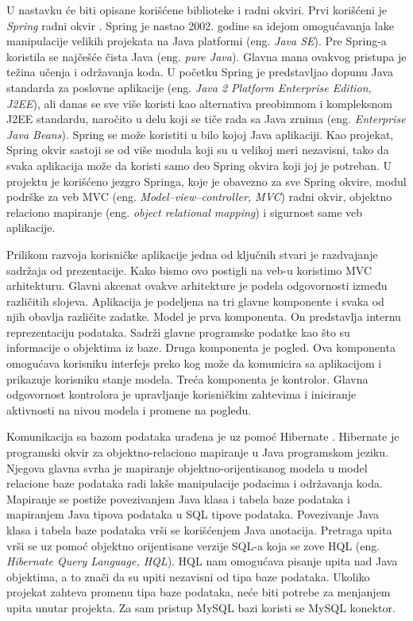 \documentclass[12pt,oneside]{memoir}
\begin{document}
U nastavku će biti opisane korišćene biblioteke i radni okviri. Prvi korišćeni je \textit{Spring} radni okvir \cite{Spring}.
Spring je nastao 2002. godine sa idejom omogućavanja lake manipulacije velikih projekata na Java platformi (eng. \textit{Java SE}). Pre Spring-a koristila se najčešće čista Java (eng. \textit{pure Java}). Glavna mana ovakvog pristupa je težina učenja i održavanja koda. U početku Spring je predstavljao dopunu Java standarda za poslovne aplikacije (eng. \textit{Java 2 Platform Enterprise Edition, J2EE}), ali danas se sve više koristi kao alternativa preobimnom i kompleksnom J2EE standardu, naročito u delu koji se tiče rada sa Java zrnima (eng. \textit{Enterprise Java Beans}). Spring se može koristiti u bilo kojoj Java aplikaciji. Kao projekat, Spring okvir sastoji se od više modula koji su u velikoj meri nezavisni, tako da svaka aplikacija može da koristi samo deo Spring okvira koji joj je potreban. U projektu je korišćeno jezgro Springa, koje je obavezno za sve Spring okvire, modul podrške za veb MVC (eng. \textit{Model–view–controller, MVC}) radni okvir, objektno relaciono mapiranje (eng. \textit{object relational mapping}) i sigurnost same veb aplikacije.

Prilikom razvoja korisničke aplikacije jedna od ključnih stvari je razdvajanje sadržaja od prezentacije. Kako bismo ovo postigli na veb-u koristimo MVC arhitekturu. Glavni akcenat ovakve arhitekture je podela odgovornosti između različitih slojeva. Aplikacija je podeljena na tri glavne komponente i svaka od njih obavlja različite zadatke. Model je prva komponenta. On predstavlja internu reprezentaciju podataka. Sadrži glavne programske podatke kao što su informacije o objektima iz baze. Druga komponenta je pogled. Ova komponenta omogućava korisniku interfejs preko kog može da komunicira sa aplikacijom i prikazuje korisniku stanje modela. Treća komponenta je kontrolor. Glavna odgovornost kontrolora je upravljanje korisničkim zahtevima i iniciranje aktivnosti na nivou modela i promene na pogledu. 

Komunikacija sa bazom podataka urađena je uz pomoć Hibernate \cite{Hibernate}. Hibernate je programski okvir za objektno-relaciono mapiranje u Java programskom jeziku. Njegova glavna svrha je mapiranje objektno-orijentisanog modela u model relacione baze podataka radi lakše manipulacije podacima i održavanja koda. Mapiranje se postiže povezivanjem Java klasa i tabela baze podataka i mapiranjem Java tipova podataka u SQL tipove podataka. Povezivanje Java klasa i tabela baze podataka vrši se korišćenjem Java anotacija. Pretraga upita vrši se uz pomoć objektno orijentisane verzije SQL-a koja se zove HQL (eng. \textit{Hibernate Query Language, HQL}). HQL nam omogućava pisanje upita nad Java objektima, a to znači da su upiti nezavisni od tipa baze podataka. Ukoliko projekat zahteva promenu tipa baze podataka, neće biti potrebe za menjanjem upita unutar projekta. Za sam pristup MySQL bazi koristi se MySQL konektor. 
\end{document}
